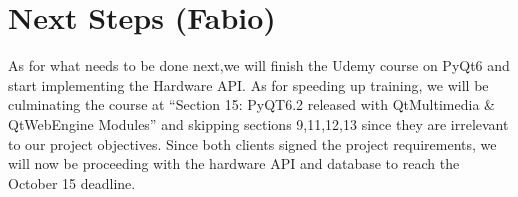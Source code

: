 \section{Next Steps (Fabio)}
As for what needs to be done next,we will finish the Udemy course on PyQt6 and start implementing the Hardware API. As for speeding up training, we will be culminating the course at ``Section 15: PyQT6.2 released with QtMultimedia \& QtWebEngine Modules'' and skipping sections 9,11,12,13 since they are irrelevant to our project objectives. Since both clients signed the project requirements, we will now be proceeding with the hardware API and database to reach the October 15 deadline.